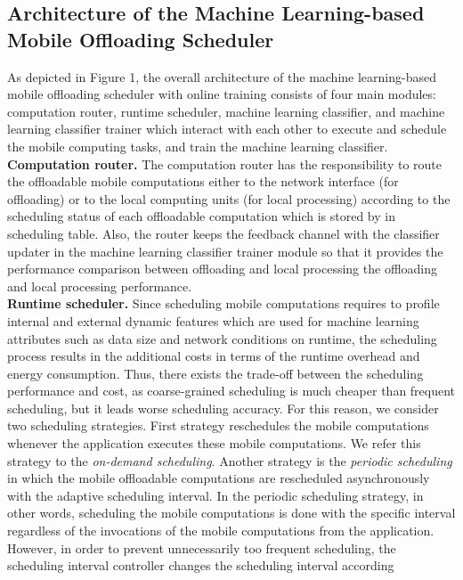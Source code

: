 \documentclass[10pt, conference, compsocconf]{IEEEtran}
\begin{document}
\subsection{Architecture of the Machine Learning-based Mobile Offloading
Scheduler}
%
As depicted in Figure 1, the overall architecture of the machine
learning-based mobile offloading scheduler with online training consists
of four main modules: computation router, runtime scheduler, machine
learning classifier, and machine learning classifier trainer which
interact with each other to execute and schedule the mobile computing
tasks, and train the machine learning classifier.\\
%
\textbf{Computation router.} The computation router has the
responsibility to route the offloadable mobile computations either to the
network interface (for offloading) or to the local computing units (for
local processing) according to the scheduling status of each offloadable
computation which is stored by in scheduling table.
%
Also, the router keeps the feedback channel with the classifier updater
in the machine learning classifier trainer module so that it provides
the performance comparison between offloading and local processing 
the offloading and local processing performance.\\
%
\textbf{Runtime scheduler.} Since scheduling mobile computations
requires to profile internal and external dynamic features which are
used for machine learning attributes such as data size and network
conditions on runtime, the scheduling process results in the additional
costs in terms of the runtime overhead and energy consumption.
%
Thus, there exists the trade-off between the scheduling performance and
cost, as coarse-grained scheduling is much cheaper than frequent
scheduling, but it leads worse scheduling accuracy.    
%
For this reason, we consider two scheduling strategies.
%
First strategy reschedules the mobile computations whenever the
application executes these mobile computations.
%
We refer this strategy to the \textit{on-demand scheduling}.
%
Another strategy is the \textit{periodic scheduling} in which the mobile
offloadable computations are rescheduled asynchronously with the adaptive
scheduling interval.
%
In the periodic scheduling strategy, in other words, scheduling the mobile
computations is done with the specific interval regardless of the
invocations of the mobile computations from the application.
%
However, in order to prevent unnecessarily too frequent scheduling, the
scheduling interval controller changes the scheduling interval according
\end{document}
